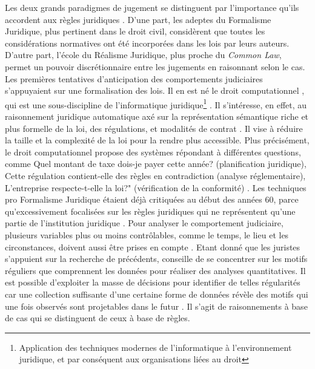 Les deux grands paradigmes de jugement se distinguent par l'importance qu'ils accordent aux règles juridiques \citep{tumonis2012legalrealism}. D'une part, les adeptes du Formalisme Juridique, plus pertinent dans le droit civil, considèrent que toutes les considérations normatives ont été incorporées dans les lois par leurs auteurs. D'autre part, l'école du Réalisme Juridique, plus proche du \og \textit{Common Law}\fg{}, permet un pouvoir discrétionnaire entre les jugements en raisonnant selon le cas. Les premières tentatives d'anticipation des comportements judiciaires s'appuyaient sur une formalisation des lois. Il en est né le \og droit computationnel \fg{}, qui est une sous-discipline de  l'\og informatique juridique\footnote{Application des techniques modernes de l'informatique à l'environnement juridique, et par conséquent aux organisations liées au droit} \fg{}. Il  s'intéresse, en effet, au raisonnement juridique automatique axé sur la représentation sémantique riche et plus formelle de la loi, des régulations, et modalités de contrat \citep{love2005computationallaw}. Il vise à réduire la taille et la complexité de la loi pour la rendre plus accessible. Plus précisément, le \og droit computationnel \fg{} propose des systèmes répondant à différentes questions, comme \og Quel montant de taxe dois-je payer cette année? \fg{} (planification juridique), \og Cette régulation contient-elle des règles en contradiction\fg{} (analyse réglementaire),  \og L'entreprise respecte-t-elle la loi?" (vérification de la conformité) \citep{Genesereth2015computationallaw}. Les techniques pro Formalisme Juridique étaient déjà critiquées au début des années 60, parce qu'excessivement focalisées sur les règles juridiques qui ne représentent qu'une partie de l'institution juridique \citep{llewellyn1962jurisprudence}. Pour analyser le comportement judiciaire, plusieurs variables plus ou moins contrôlables, comme le temps, le lieu et les circonstances, doivent aussi être prises en compte \citep{ulmer1963quantitative}. Etant donné que les juristes s'appuient sur la recherche de précédents, \citet{ulmer1963quantitative} conseille de se concentrer sur les motifs réguliers que comprennent les données pour réaliser des analyses quantitatives. Il est possible d'exploiter la masse de décisions pour identifier de telles régularités car une collection suffisante d'une certaine forme de données révèle des motifs qui une fois observés sont projetables dans le futur \citep{ulmer1963quantitative}. Il s'agit de raisonnements à base de cas qui se distinguent de ceux à base de règles.

